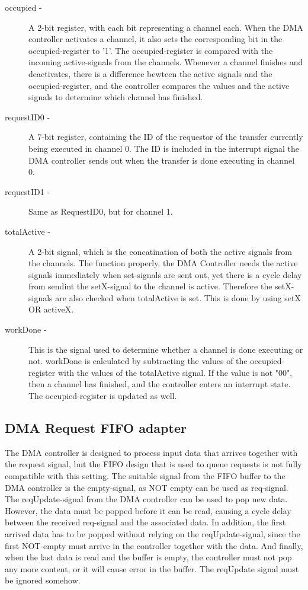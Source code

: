 \begin{appendix}
\begin{description}
    \item[occupied -]
    A 2-bit register, with each bit representing a channel each.
    When the DMA controller activates a channel, it also sets the corresponding bit in the occupied-register to '1'.
    The occupied-register is compared with the incoming active-signals from the channels.
    Whenever a channel finishes and deactivates, there is a difference bewteen the active signals and the occupied-register, and the controller compares the values and the active signals to determine which channel has finished.
    \item[requestID0 -]
    A 7-bit register, containing the ID of the requestor of the transfer currently being executed in channel 0.
    The ID is included in the interrupt signal the DMA controller sends out when the transfer is done executing in channel 0.
    \item[requestID1 -]
    Same as RequestID0, but for channel 1.
    \item[totalActive -]
    A 2-bit signal, which is the concatination of both the active signals from the channels.
    The function properly, the DMA Controller needs the active signals immediately when set-signals are sent out, yet there is a cycle delay from sendint the setX-signal to the channel is active.
    Therefore the setX-signals are also checked when totalActive is set.
    This is done by using setX OR activeX.
    \item[workDone - ]
    This is the signal used to determine whether a channel is done executing or not.
    workDone is calculated by subtracting the values of the occupied-register with the values of the totalActive signal.
    If the value is not "00", then a channel has finished, and the controller enters an interrupt state.
    The occupied-register is updated as well.
\end{description}

\subsection{DMA Request FIFO adapter}

The DMA controller is designed to process input data that arrives together with the request signal, but the FIFO design that is used to queue requests is not fully compatible with this setting.
The suitable signal from the FIFO buffer to the DMA controller is the empty-signal, as NOT empty can be used as req-signal.
The reqUpdate-signal from the DMA controller can be used to pop new data.
However, the data must be popped before it can be read, causing a cycle delay between the received req-signal and the associated data.
In addition, the first arrived data has to be popped without relying on the reqUpdate-signal, since the first NOT-empty must arrive in the controller together with the data.
And finally, when the last data is read and the buffer is empty, the controller must not pop any more content, or it will cause error in the buffer.
The reqUpdate signal must be ignored somehow.
   

\end{appendix}
